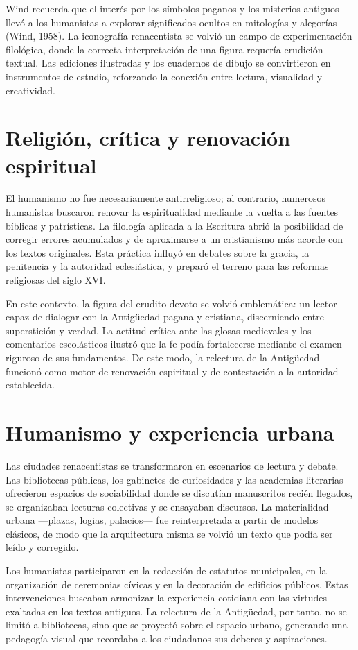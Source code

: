 Wind recuerda que el interés por los símbolos paganos y los misterios antiguos llevó a los humanistas a explorar significados ocultos en mitologías y alegorías (Wind, 1958). La iconografía renacentista se volvió un campo de experimentación filológica, donde la correcta interpretación de una figura requería erudición textual. Las ediciones ilustradas y los cuadernos de dibujo se convirtieron en instrumentos de estudio, reforzando la conexión entre lectura, visualidad y creatividad.

\section{Religión, crítica y renovación espiritual}
El humanismo no fue necesariamente antirreligioso; al contrario, numerosos humanistas buscaron renovar la espiritualidad mediante la vuelta a las fuentes bíblicas y patrísticas. La filología aplicada a la Escritura abrió la posibilidad de corregir errores acumulados y de aproximarse a un cristianismo más acorde con los textos originales. Esta práctica influyó en debates sobre la gracia, la penitencia y la autoridad eclesiástica, y preparó el terreno para las reformas religiosas del siglo XVI.

En este contexto, la figura del erudito devoto se volvió emblemática: un lector capaz de dialogar con la Antigüedad pagana y cristiana, discerniendo entre superstición y verdad. La actitud crítica ante las glosas medievales y los comentarios escolásticos ilustró que la fe podía fortalecerse mediante el examen riguroso de sus fundamentos. De este modo, la relectura de la Antigüedad funcionó como motor de renovación espiritual y de contestación a la autoridad establecida.

\section{Humanismo y experiencia urbana}
Las ciudades renacentistas se transformaron en escenarios de lectura y debate. Las bibliotecas públicas, los gabinetes de curiosidades y las academias literarias ofrecieron espacios de sociabilidad donde se discutían manuscritos recién llegados, se organizaban lecturas colectivas y se ensayaban discursos. La materialidad urbana —plazas, logias, palacios— fue reinterpretada a partir de modelos clásicos, de modo que la arquitectura misma se volvió un texto que podía ser leído y corregido.

Los humanistas participaron en la redacción de estatutos municipales, en la organización de ceremonias cívicas y en la decoración de edificios públicos. Estas intervenciones buscaban armonizar la experiencia cotidiana con las virtudes exaltadas en los textos antiguos. La relectura de la Antigüedad, por tanto, no se limitó a bibliotecas, sino que se proyectó sobre el espacio urbano, generando una pedagogía visual que recordaba a los ciudadanos sus deberes y aspiraciones.

